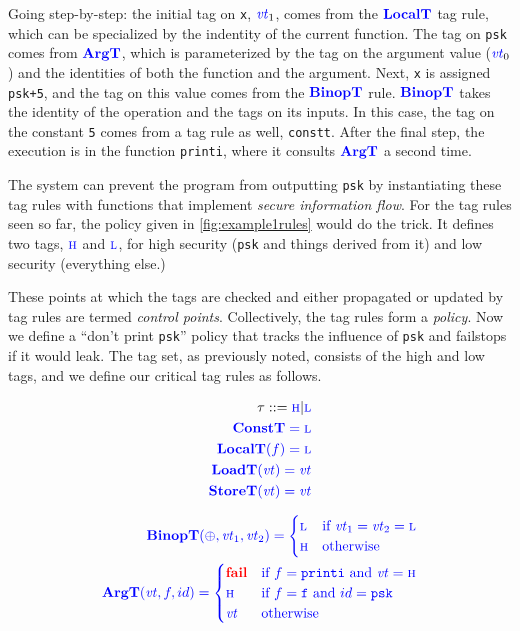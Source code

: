 \documentclass{llncs}
\begin{document}
Going step-by-step: the initial tag on {\tt x}, \(\mathit{\color{blue} vt}_1\), comes from the \(\color{blue} \mathbf{LocalT}\) tag rule,
which can be specialized by the indentity of the current function. The tag on {\tt psk}
comes from \(\color{blue} \mathbf{ArgT}\), which is parameterized by the tag on the argument value (\(\mathit{\color{blue} vt}_0\)) and
the identities of both the function and the argument. Next, {\tt x} is assigned {\tt psk+5}, and the
tag on this value comes from the \(\color{blue} \mathbf{BinopT}\) rule. \(\color{blue} \mathbf{BinopT}\) takes the identity of the operation
and the tags on its inputs. In this case, the tag on the constant {\tt 5} comes from a tag rule as well,
{\tt constt}. After the final step, the execution is in the function {\tt printi}, where it consults
\(\color{blue} \mathbf{ArgT}\) a second time.

The system can prevent the program from outputting {\tt psk} by instantiating these tag rules with
functions that implement {\em secure information flow}. For the tag rules seen so far, the policy given in
\cref{fig:example1rules} would do the trick. It defines two tags, \(\textnormal{\color{blue} \sc h}\) and \(\textnormal{\color{blue} \sc l}\), for high
security ({\tt psk} and things derived from it) and low security (everything else.)

These points at which the tags are checked and either propagated or updated by tag rules are termed
{\em control points}. Collectively, the tag rules form a {\em policy}. Now we define a
``don't print {\tt psk}'' policy that tracks the influence of {\tt psk} and failstops if it would
leak. The tag set, as previously noted, consists of the high and low tags, and we define our critical
tag rules as follows.

\begin{minipage}{0.3\textwidth}
  \begin{align*}
  \tau::=\textnormal{\color{blue} \sc h} | \textnormal{\color{blue} \sc l} \\
  \color{blue} \mathbf{ConstT} = \textnormal{\color{blue} \sc l} \\
  \color{blue} \mathbf{LocalT}(f) = \textnormal{\color{blue} \sc l} \\
  \color{blue} \mathbf{LoadT}(\mathit{\color{blue} vt}) = \mathit{\color{blue} vt} \\
  \color{blue} \mathbf{StoreT}(\mathit{\color{blue} vt}) = \mathit{\color{blue} vt} \\
  \end{align*}
\end{minipage}
\begin{minipage}{0.6\textwidth}
\begin{align*}
  \color{blue} \mathbf{BinopT}(\oplus,\mathit{\color{blue} vt}_1,\mathit{\color{blue} vt}_2) = \begin{cases} \textnormal{\color{blue} \sc l} & \textnormal{if } \mathit{\color{blue} vt}_1 = \mathit{\color{blue} vt}_2 = \textnormal{\color{blue} \sc l} \\
    \textnormal{\color{blue} \sc h} & \textnormal{otherwise} \end{cases}\\
  \color{blue} \mathbf{ArgT}(\mathit{\color{blue} vt}, f, id) = \begin{cases} \mathbf{\color{red} fail} & \textnormal{if } f=\mathtt{printi} \textnormal{ and } \mathit{\color{blue} vt} = \textnormal{\color{blue} \sc h} \\
    \textnormal{\color{blue} \sc h} & \textnormal{if } f=\mathtt{f} \textnormal{ and } id = \mathtt{psk} \\
    \mathit{\color{blue} vt} & \textnormal{otherwise} \\
  \end{cases} \\
\end{align*}
\end{minipage}
\end{document}
